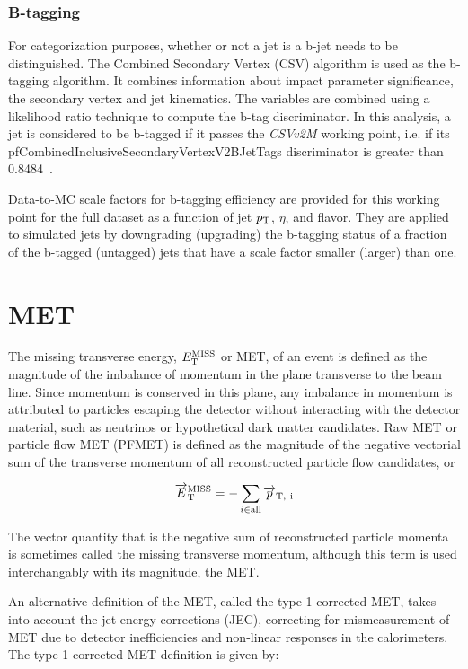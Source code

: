 \subsubsection{B-tagging}

For categorization purposes, whether or not a jet is a b-jet needs to be distinguished.
The Combined Secondary Vertex (CSV) algorithm is used as the b-tagging algorithm.
It combines information about impact parameter significance,
the secondary vertex and jet kinematics.
The variables are combined using a likelihood ratio technique to compute the b-tag discriminator.
In this analysis, a jet is considered to be b-tagged if it passes the \emph{CSVv2M} working point,
i.e. if its pfCombinedInclusiveSecondaryVertexV2BJetTags discriminator is greater than 0.8484~\cite{btagReferenceEffsRun2}.

Data-to-MC scale factors for b-tagging efficiency are provided for this working point for the full dataset as a function of jet $p_{\rm{T}}$, $\eta$, and flavor.
They are applied to simulated jets by downgrading (upgrading) the b-tagging status of a fraction of the b-tagged (untagged) jets that have a scale factor smaller (larger) than one.

\section{MET}

The missing transverse energy, $E_{\rm{T}}^{\rm{MISS}}$ or MET, of an event is defined as the magnitude of the imbalance of momentum in the plane transverse to the beam line. Since momentum is conserved in this plane, any imbalance in momentum is attributed to particles escaping the detector without interacting with the detector material, such as neutrinos or hypothetical dark matter candidates. Raw MET or particle flow MET (PFMET) is defined as the magnitude of the negative vectorial sum of the transverse momentum of all reconstructed particle flow candidates, or

\begin{equation}
\overrightarrow{E}_{\rm{T}}^{\rm{MISS}} = - \sum_{i \in \rm{all}} \overrightarrow{p}_{\rm{T},\ i}
\end{equation}

The vector quantity that is the negative sum of reconstructed particle momenta is sometimes called the missing transverse momentum, although this term is used interchangably with its magnitude, the MET. 

An alternative definition of the MET, called the type-1 corrected MET, takes into account the jet energy corrections (JEC), correcting for mismeasurement of MET due to detector inefficiencies and non-linear responses in the calorimeters. The type-1 corrected MET definition is given by:

